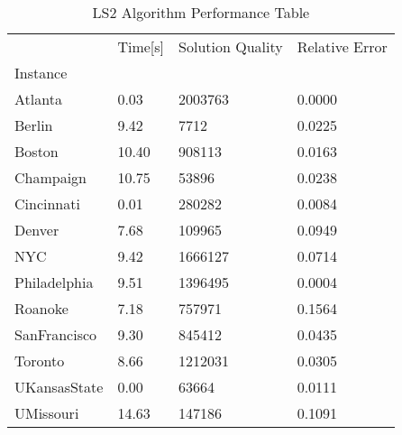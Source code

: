 \begin{table}[htpb]
\caption{ LS2 Algorithm Performance Table }
\begin{tabular}{llll}
\toprule
{} & Time[s] & Solution Quality & Relative Error \\
Instance     &         &                  &                \\
\midrule
Atlanta      &    0.03 &          2003763 &         0.0000 \\
Berlin       &    9.42 &             7712 &         0.0225 \\
Boston       &   10.40 &           908113 &         0.0163 \\
Champaign    &   10.75 &            53896 &         0.0238 \\
Cincinnati   &    0.01 &           280282 &         0.0084 \\
Denver       &    7.68 &           109965 &         0.0949 \\
NYC          &    9.42 &          1666127 &         0.0714 \\
Philadelphia &    9.51 &          1396495 &         0.0004 \\
Roanoke      &    7.18 &           757971 &         0.1564 \\
SanFrancisco &    9.30 &           845412 &         0.0435 \\
Toronto      &    8.66 &          1212031 &         0.0305 \\
UKansasState &    0.00 &            63664 &         0.0111 \\
UMissouri    &   14.63 &           147186 &         0.1091 \\
\bottomrule
\end{tabular}
\end{table}
